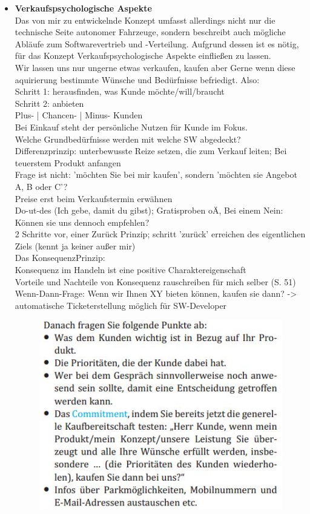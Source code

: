 \begin{itemize}
	\item \textbf{Verkaufspsychologische Aspekte}\\
	Das von mir zu entwickelnde Konzept umfasst allerdings nicht nur die technische Seite autonomer Fahrzeuge, sondern beschreibt auch mögliche Abläufe zum Softwarevertrieb und -Verteilung. Aufgrund dessen ist es nötig, für das Konzept Verkaufspsychologische Aspekte\cite{b15} einfließen zu lassen.\\
	Wir lassen uns nur ungerne etwas verkaufen, kaufen aber Gerne wenn diese aquirierung bestimmte Wünsche und Bedürfnisse befriedigt. Also: \\
	Schritt 1: herausfinden, was Kunde möchte/will/braucht\\
	Schritt 2: anbieten\\
	Plus- | Chancen- | Minus- Kunden\\
	Bei Einkauf steht der persönliche Nutzen für Kunde im Fokus.\\
	Welche Grundbedürfnisse werden mit welche SW abgedeckt?\\
	Differenzprinzip: unterbewusste Reize setzen, die zum Verkauf leiten; Bei teuerstem Produkt anfangen\\
	Frage ist nicht: 'möchten Sie bei mir kaufen', sondern 'möchten sie Angebot A, B oder C'?\\
	Preise erst beim Verkaufstermin erwähnen\\
	Do-ut-des (Ich gebe, damit du gibst); Gratisproben oÄ, Bei einem Nein: Können sie uns dennoch empfehlen?\\
	2 Schritte vor, einer Zurück Prinzip; schritt 'zurück' erreichen des eigentlichen Ziels (kennt ja keiner außer mir)\\
	Das KonsequenzPrinzip:\\
	Konsequenz im Handeln ist eine positive Charaktereigenschaft\\
	Vorteile und Nachteile von Konsequenz rauschreiben für mich selber (S. 51)\\
	Wenn-Dann-Frage: Wenn wir Ihnen XY bieten können, kaufen sie dann? -> automatische Ticketerstellung möglich für SW-Developer\\
	\begin{figure}[H]
		\centering
		\includegraphics[width=0.734\columnwidth]{pictures/fragenBeiTerminvereinbarung.jpg}

\end{figure}
\end{itemize}
